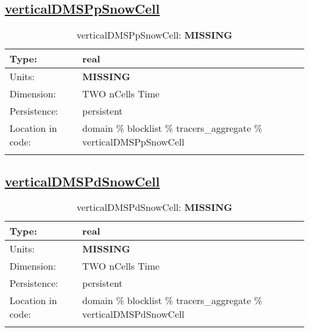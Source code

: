 \subsection[verticalDMSPpSnowCell]{\hyperref[sec:var_tab_tracers_aggregate]{verticalDMSPpSnowCell}}
\label{subsec:var_sec_tracers_aggregate_verticalDMSPpSnowCell}
\begin{center}
\begin{longtable}{| p{2.0in} | p{4.0in} |}
        \hline 
        Type: & real \\
        \hline 
        Units: & {\bf \color{red} MISSING} \\
        \hline 
        Dimension: & TWO nCells Time \\
        \hline 
        Persistence: & persistent \\
        \hline 
         Location in code: & domain \% blocklist \% tracers\_aggregate \% verticalDMSPpSnowCell \\
         \hline 
    \caption{verticalDMSPpSnowCell: {\bf \color{red} MISSING}}
\end{longtable}
\end{center}
\subsection[verticalDMSPdSnowCell]{\hyperref[sec:var_tab_tracers_aggregate]{verticalDMSPdSnowCell}}
\label{subsec:var_sec_tracers_aggregate_verticalDMSPdSnowCell}
\begin{center}
\begin{longtable}{| p{2.0in} | p{4.0in} |}
        \hline 
        Type: & real \\
        \hline 
        Units: & {\bf \color{red} MISSING} \\
        \hline 
        Dimension: & TWO nCells Time \\
        \hline 
        Persistence: & persistent \\
        \hline 
         Location in code: & domain \% blocklist \% tracers\_aggregate \% verticalDMSPdSnowCell \\
         \hline 
    \caption{verticalDMSPdSnowCell: {\bf \color{red} MISSING}}
\end{longtable}
\end{center}
